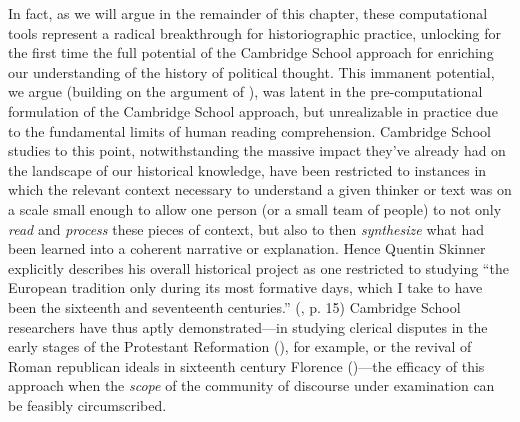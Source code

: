 \documentclass[11pt]{article}
\begin{document}
In fact, as we will argue in the remainder of this chapter, these computational tools represent a radical breakthrough for historiographic practice, unlocking for the first time the full potential of the Cambridge School approach for enriching our understanding of the history of political thought.
This immanent potential, we argue (building on the argument of \cite{london_reimagining_2016}), was latent in the pre-computational formulation of the Cambridge School approach, but unrealizable in practice due to the fundamental limits of human reading comprehension. Cambridge School studies to this point, notwithstanding the massive impact they've already had on the landscape of our historical knowledge, have been restricted to instances in which the relevant context necessary to understand a given thinker or text was on a scale small enough to allow one person (or a small team of people) to not only \textit{read} and \textit{process} these pieces of context, but also to then \textit{synthesize} what had been learned into a coherent narrative or explanation. Hence Quentin Skinner explicitly describes his overall historical project as one restricted to studying ``the European tradition only during its most formative days, which I take to have been the sixteenth and seventeenth centuries.'' (\cite{scott_schools_2001}, p. 15) Cambridge School researchers have thus aptly demonstrated---in studying clerical disputes in the early stages of the Protestant Reformation (\cite{skinner_foundations_1978b}), for example, or the revival of Roman republican ideals in sixteenth century Florence (\cite{pocock_machiavellian_1975})---the %
efficacy of this approach when the \textit{scope} of the community of discourse under examination can be feasibly circumscribed.
\end{document}
